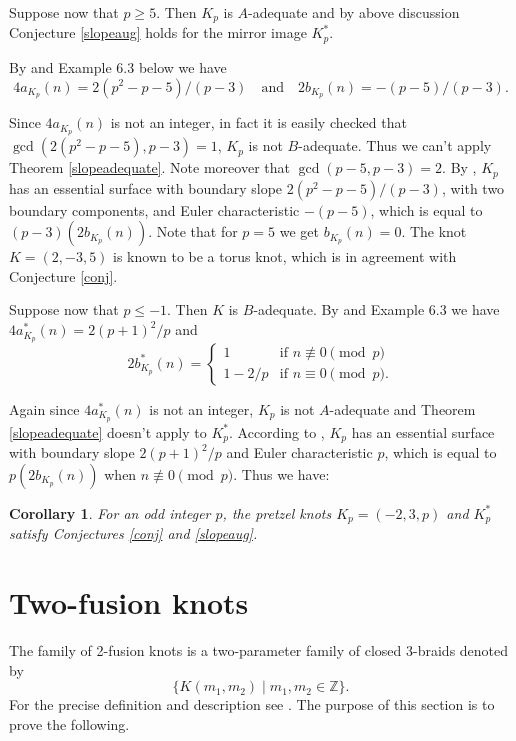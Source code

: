 \documentclass[11pt]{amsart}
\newtheorem{corollary}[theorem]{Corollary}
\theoremstyle{definition}
\newcommand{\ZZ}{{\mathbb{Z}}}
\begin{document}
 
Suppose now that  $p \ge 5$. Then $K_p$ is $A$-adequate and  by above discussion Conjecture  \ref{slopeaug} 
holds  for
the mirror image $K_p^{*}$.


By \cite[Section 4.7]{Ga-slope} and Example 6.3 below we have $$4a_{K_p}(n) = 2(p^2-p-5)/(p-3) \quad \text{and} \quad 2b_{K_p}(n) = 
-(p-5)/(p-3).$$

Since $4a_{K_p}(n)$ is not an integer, in fact it is easily checked that $ \gcd ( 2(p^2-p-5), p-3)=1$, $K_p$ is not $B$-adequate.
Thus we can't apply Theorem  \ref{slopeadequate}. Note moreover that $\gcd(p-5, p-3)=2$.
By  \cite[Theorem 3.3]{callahan}, $K_p$ has an essential surface with boundary slope $2(p^2-p-5)/(p-3)$, with two boundary components, and Euler characteristic $-(p-5)$, which is equal to $(p-3)(2b_{K_p}(n))$.   
Note that for $p=5$ we get $b_{K_p}(n)=0$. The knot $K=(2,-3,5)$ is known to be a torus knot, which is in agreement with Conjecture \ref{conj}.


Suppose now that $p \le -1$. Then $K$ is $B$-adequate. By \cite[Section 4.7]{Ga-slope} and Example 6.3
we have $4a^*_{K_p}(n) = 2(p+1)^2/p$ and $$2b^*_{K_p}(n) = 
\begin{cases}
1 &\mbox{if } n \not\equiv 0 \pmod{p} \\ 
1 - 2/p & \mbox{if } n \equiv 0 \pmod{p}.
\end{cases}$$

Again since $4a^*_{K_p}(n)$ is not an integer, $K_p$ is not $A$-adequate and Theorem  \ref{slopeadequate} doesn't apply to $K_p^*$.
According to \cite[Theorem 3.3]{callahan}, 
 $K_p$ has an essential surface with boundary slope $2(p+1)^2/p$ and Euler characteristic $p$, which is equal to $p(2b_{K_p}(n))$ when $n \not\equiv 0 \pmod{p}$. Thus we have:
 
\begin{corollary} For an odd integer $p$,  the pretzel knots  $K_p=(-2,3,p)$ and $K^{*}_p$
satisfy Conjectures \ref{conj} and \ref{slopeaug}. 
\end{corollary}

\section{Two-fusion knots}

The family of 2-fusion knots is a two-parameter family  of closed 3-braids denoted
by
$$\{ K(m_1, m_2)  \mid  m_1, m_2\in \ZZ\}.$$
For the precise definition and description see \cite {GV, DG}. The purpose of this section is to prove the following.
\end{document}
